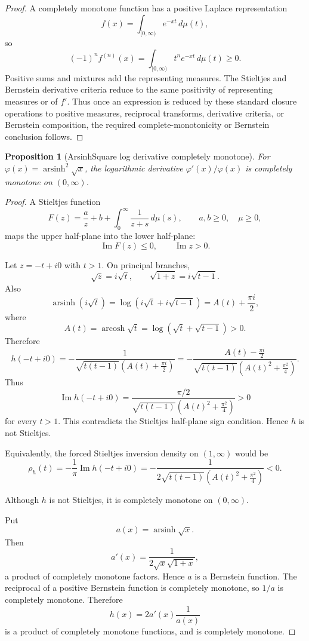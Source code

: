 \documentclass[11pt]{article}
\numberwithin{equation}{section}
\newtheorem{proposition}[theorem]{Proposition}
\theoremstyle{definition}
\theoremstyle{remark}
\newcommand{\1}{\mathbf 1}
\begin{document}
\begin{proof}
A completely monotone function has a positive Laplace representation
\[
f(x)=\int_{[0,\infty)} e^{-xt}\,d\mu(t),
\]
so
\[
(-1)^nf^{(n)}(x)=\int_{[0,\infty)}t^ne^{-xt}\,d\mu(t)\ge0.
\]
Positive sums and mixtures add the representing measures. The Stieltjes and Bernstein derivative criteria reduce to the same positivity of representing measures or of \(f'\). Thus once an expression is reduced by these standard closure operations to positive measures, reciprocal transforms, derivative criteria, or Bernstein composition, the required complete-monotonicity or Bernstein conclusion follows.
\end{proof}

\begin{proposition}[ArsinhSquare log derivative completely monotone]
\label{res:arsinhsquare-log-derivative-completely-monotone}
For \(\varphi(x)=\operatorname{arsinh}^2\sqrt{x}\), the logarithmic derivative \(\varphi'(x)/\varphi(x)\) is completely monotone on \((0,\infty)\).
\end{proposition}

\begin{proof}
A Stieltjes function
\[
F(z)=\frac{a}{z}+b+\int_0^\infty \frac{1}{z+s}\,d\mu(s),
\qquad a,b\ge0,\quad \mu\ge0,
\]
maps the upper half-plane into the lower half-plane:
\[
\operatorname{Im}F(z)\le0,\qquad \operatorname{Im}z>0.
\]

Let \(z=-t+i0\) with \(t>1\). On principal branches,
\[
\sqrt{z}=i\sqrt t,\qquad \sqrt{1+z}=i\sqrt{t-1}.
\]
Also
\[
\operatorname{arsinh}(i\sqrt t)
=\log\left(i\sqrt t+i\sqrt{t-1}\right)
=A(t)+\frac{\pi i}{2},
\]
where
\[
A(t)=\operatorname{arcosh}\sqrt t=\log(\sqrt t+\sqrt{t-1})>0.
\]
Therefore
\[
h(-t+i0)
=-\frac{1}{\sqrt{t(t-1)}\left(A(t)+\frac{\pi i}{2}\right)}
=-\frac{A(t)-\frac{\pi i}{2}}
{\sqrt{t(t-1)}\left(A(t)^2+\frac{\pi^2}{4}\right)}.
\]
Thus
\[
\operatorname{Im}h(-t+i0)
=\frac{\pi/2}
{\sqrt{t(t-1)}\left(A(t)^2+\frac{\pi^2}{4}\right)}>0
\]
for every \(t>1\). This contradicts the Stieltjes half-plane sign condition. Hence \(h\) is not Stieltjes.

Equivalently, the forced Stieltjes inversion density on \((1,\infty)\) would be
\[
\rho_h(t)=-\frac{1}{\pi}\operatorname{Im}h(-t+i0)
=-\frac{1}
{2\sqrt{t(t-1)}\left(A(t)^2+\frac{\pi^2}{4}\right)}<0.
\]

Although \(h\) is not Stieltjes, it is completely monotone on \((0,\infty)\).

Put
\[
a(x)=\operatorname{arsinh}\sqrt{x}.
\]
Then
\[
a'(x)=\frac{1}{2\sqrt{x}\sqrt{1+x}},
\]
a product of completely monotone factors. Hence \(a\) is a Bernstein function. The reciprocal of a positive Bernstein function is completely monotone, so \(1/a\) is completely monotone. Therefore
\[
h(x)=2a'(x)\frac1{a(x)}
\]
is a product of completely monotone functions, and is completely monotone.
\end{proof}
\end{document}
